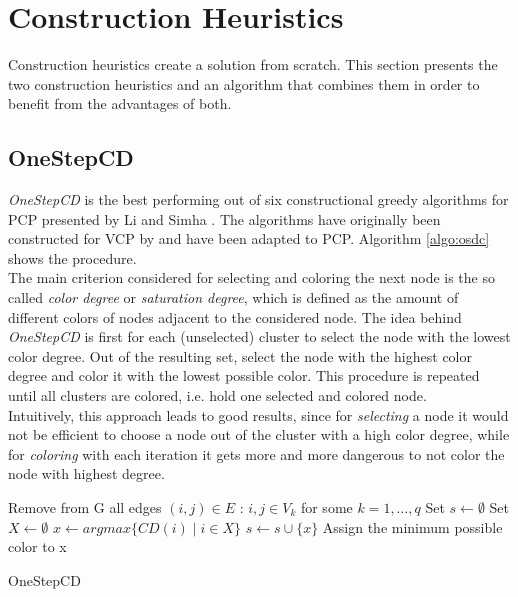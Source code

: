 \section{Construction Heuristics}
\label{sec:construction}
Construction heuristics create a solution from scratch. This section presents the two construction heuristics and an algorithm that combines them in order to benefit from the advantages of both.
\subsection{OneStepCD}
\textit{OneStepCD} is the best performing out of six constructional greedy algorithms for PCP presented by Li and Simha \cite{li-00}. The algorithms have originally been constructed for VCP by \cite{brelaz-79} and have been adapted to PCP. Algorithm \ref{algo:osdc} shows the procedure.\\
The main criterion considered for selecting and coloring the next node is the so called \textit{color degree} or \textit{saturation degree}, which is defined as the amount of different colors of nodes adjacent to the considered node. The idea behind \textit{OneStepCD} is first for each (unselected) cluster to select the node with the lowest color degree. Out of the resulting set, select the node with the highest color degree and color it with the lowest possible color. This procedure is repeated until all clusters are colored, i.e. hold one selected and colored node.\\
Intuitively, this approach leads to good results, since for \textit{selecting} a node it would not be efficient to choose a node out of the cluster with a high color degree, while for \textit{coloring} with each iteration it gets more and more dangerous to not color the node with highest degree.

\begin{algorithm}[h]
Remove from G all edges $(i,j) \in E$ : $i,j \in V_k$ for some $k=1,\ldots,q$\; 
Set $s \gets \emptyset $\;
 {
  Set $X \gets \emptyset $\;
  $x \gets argmax\{CD(i) \mid i \in X \}$\;
  $s \gets s \cup \{x\}$\;
  Assign the minimum possible color to x\;
}
\;
\caption{OneStepCD}
\label{algo:osdc}
\end{algorithm}

